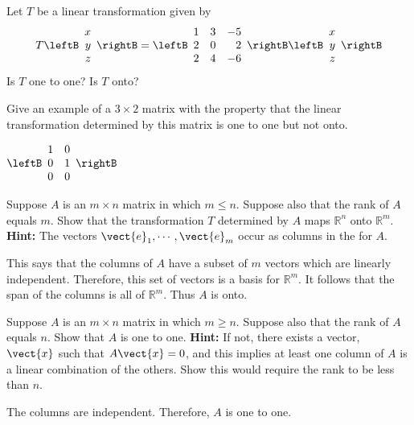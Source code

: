 \begin{enumialphparenastyle}
\begin{ex} Let $T$ be a linear transformation given by 
\[
T \leftB \begin{array}{r}
x\\
y \\
z
\end{array}\rightB = \leftB \begin{array}{rrr}
1 & 3 & -5  \\
2 & 0 & 2 \\
2 & 4 & -6 
\end{array}\rightB
 \leftB \begin{array}{r}
x\\
y \\
z
\end{array}\rightB 
\]
Is $T$ one to one? Is $T$ onto?
\end{ex}


\begin{ex} Give an example of a $3\times 2$ matrix with the property that the
linear transformation determined by this matrix is one to one but not onto. 
\begin{sol}
$\leftB
\begin{array}{cc}
1 & 0 \\
0 & 1 \\
0 & 0
\end{array}
\rightB $
\end{sol}
\end{ex}

\begin{ex} Suppose $A$ is an $m\times n$ matrix in which $m\leq n.$ Suppose also
that the rank of $A$ equals $m.$ Show that the transformation $T$ determined by $A$ 
maps $\mathbb{R}^{n}$ onto $\mathbb{R}^{m}$.
 \textbf{Hint: }The vectors $\vect{e}_{1},\cdots , \vect{e}_{m}$ occur as columns in the \rref \;for $A.$ \vspace{1mm} 
\begin{sol}
 This says
that the columns of $A$ have a subset of $m$ vectors which are linearly
independent. Therefore, this set of vectors is a basis for $\mathbb{R}^{m}$.
It follows that the span of the columns is all of $\mathbb{R}^{m}$. Thus $A$
is onto.
\end{sol}
\end{ex}

\begin{ex} Suppose $A$ is an $m\times n$ matrix in which $m\geq n.$ Suppose also
that the rank of $A$ equals $n.$ Show that $A$ is one to one. \textbf{Hint: }
If not, there exists a vector, $\vect{x}$ such that $A\vect{x}=0$, and
this implies at least one column of $A$ is a linear combination of the
others. Show this would require the rank to be less than $n.$ \vspace{1mm}
\begin{sol}
The
columns are independent. Therefore, $A$ is one to one.
\end{sol}
\end{ex}


\end{enumialphparenastyle}
